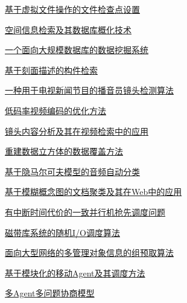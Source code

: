 \documentclass[a4paper]{article}
\begin{document}
\href{http://www.jos.org.cn/ch/reader/download_pdf.aspx?file_no=20020826&year_id=2002&quarter_id=8&falg=1}{基于虚拟文件操作的文件检查点设置}

\href{http://www.jos.org.cn/ch/reader/download_pdf.aspx?file_no=20020827&year_id=2002&quarter_id=8&falg=1}{空间信息检索及其数据库概化技术}

\href{http://www.jos.org.cn/ch/reader/download_pdf.aspx?file_no=20020828&year_id=2002&quarter_id=8&falg=1}{一个面向大规模数据库的数据挖掘系统}

\href{http://www.jos.org.cn/ch/reader/download_pdf.aspx?file_no=20020829&year_id=2002&quarter_id=8&falg=1}{基于刻面描述的构件检索}

\href{http://www.jos.org.cn/ch/reader/download_pdf.aspx?file_no=20020831&year_id=2002&quarter_id=8&falg=1}{一种用于电视新闻节目的播音员镜头检测算法}

\href{http://www.jos.org.cn/ch/reader/download_pdf.aspx?file_no=20020832&year_id=2002&quarter_id=8&falg=1}{低码率视频编码的优化方法}

\href{http://www.jos.org.cn/ch/reader/download_pdf.aspx?file_no=20020833&year_id=2002&quarter_id=8&falg=1}{镜头内容分析及其在视频检索中的应用}

\href{http://www.jos.org.cn/ch/reader/download_pdf.aspx?file_no=20020834&year_id=2002&quarter_id=8&falg=1}{重建数据立方体的数据覆盖方法}

\href{http://www.jos.org.cn/ch/reader/download_pdf.aspx?file_no=20020835&year_id=2002&quarter_id=8&falg=1}{基于隐马尔可夫模型的音频自动分类}

\href{http://www.jos.org.cn/ch/reader/download_pdf.aspx?file_no=20020836&year_id=2002&quarter_id=8&falg=1}{基于模糊概念图的文档聚类及其在Web中的应用}

\href{http://www.jos.org.cn/ch/reader/download_pdf.aspx?file_no=20020837&year_id=2002&quarter_id=8&falg=1}{有中断时间代价的一致并行机抢先调度问题}

\href{http://www.jos.org.cn/ch/reader/download_pdf.aspx?file_no=20020838&year_id=2002&quarter_id=8&falg=1}{磁带库系统的随机I/O调度算法}

\href{http://www.jos.org.cn/ch/reader/download_pdf.aspx?file_no=20020839&year_id=2002&quarter_id=8&falg=1}{面向大型网络的多管理对象信息的组预取算法}

\href{http://www.jos.org.cn/ch/reader/download_pdf.aspx?file_no=20020840&year_id=2002&quarter_id=8&falg=1}{基于模块化的移动Agent及其调度方法}

\href{http://www.jos.org.cn/ch/reader/download_pdf.aspx?file_no=20020841&year_id=2002&quarter_id=8&falg=1}{多Agent多问题协商模型}
\end{document}
